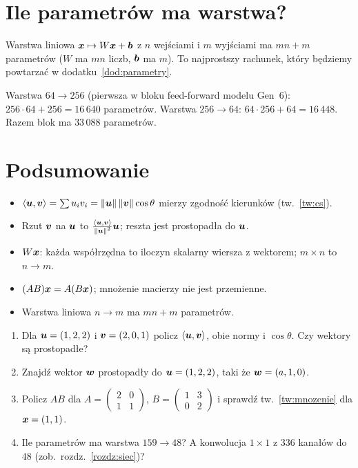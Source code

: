 \section{Ile parametrów ma warstwa?}

Warstwa liniowa $\bm{x}\mapsto W\bm{x}+\bm{b}$ z $n$ wejściami i $m$ wyjściami ma $mn+m$ parametrów
($W$ ma $mn$ liczb, $\bm{b}$ ma $m$). To najprostszy rachunek, który będziemy powtarzać w dodatku~\ref{dod:parametry}.

\begin{naliczbach}
Warstwa $64\to256$ (pierwsza w bloku feed-forward modelu Gen~6): $256\cdot64+256=16\,640$ parametrów. Warstwa
$256\to64$: $64\cdot256+64=16\,448$. Razem blok ma $33\,088$ parametrów.
\end{naliczbach}

\section*{Podsumowanie}
\begin{itemize}
\item $\left\langle \bm{u},\bm{v}\right\rangle=\sum u_iv_i=\left\lVert \bm{u}\right\rVert\left\lVert \bm{v}\right\rVert\cos\theta$ mierzy zgodność kierunków (tw.~\ref{tw:cs}).
\item Rzut $\bm{v}$ na $\bm{u}$ to $\frac{\left\langle \bm{u},\bm{v}\right\rangle}{\left\lVert \bm{u}\right\rVert^2}\bm{u}$; reszta jest prostopadła do $\bm{u}$.
\item $W\bm{x}$: każda współrzędna to iloczyn skalarny wiersza z wektorem; $m\times n$ to $n\to m$.
\item $(AB)\bm{x}=A(B\bm{x})$; mnożenie macierzy nie jest przemienne.
\item Warstwa liniowa $n\to m$ ma $mn+m$ parametrów.
\end{itemize}

\begin{sprawdz}
\begin{enumerate}
\item Dla $\bm{u}=(1,2,2)$ i $\bm{v}=(2,0,1)$ policz $\left\langle \bm{u},\bm{v}\right\rangle$, obie normy i $\cos\theta$. Czy wektory są prostopadłe?
\item Znajdź wektor $\bm{w}$ prostopadły do $\bm{u}=(1,2,2)$, taki że $\bm{w}=(a,1,0)$.
\item Policz $AB$ dla $A=\begin{pmatrix}2&0\\1&1\end{pmatrix}$, $B=\begin{pmatrix}1&3\\0&2\end{pmatrix}$ i sprawdź tw.~\ref{tw:mnozenie} dla $\bm{x}=(1,1)$.
\item Ile parametrów ma warstwa $159\to48$? A konwolucja $1\times1$ z $336$ kanałów do $48$ (zob.\ rozdz.~\ref{rozdz:siec})?
\end{enumerate}
\end{sprawdz}


